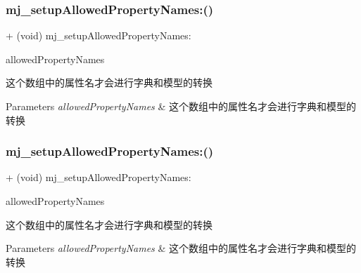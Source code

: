 \subsubsection{\texorpdfstring{mj\+\_\+setup\+Allowed\+Property\+Names\+:()}{mj\_setupAllowedPropertyNames:()}\hspace{0.1cm}{\footnotesize\ttfamily [1/3]}}
{\footnotesize\ttfamily + (void) mj\+\_\+setup\+Allowed\+Property\+Names\+: \begin{DoxyParamCaption}\item[{(M\+J\+Allowed\+Property\+Names)}]{allowed\+Property\+Names }\end{DoxyParamCaption}}

这个数组中的属性名才会进行字典和模型的转换


\begin{DoxyParams}{Parameters}
{\em allowed\+Property\+Names} & 这个数组中的属性名才会进行字典和模型的转换 \\
\hline
\end{DoxyParams}
\mbox{\label{category_n_s_object_07_m_j_class_08_a8a14f8d0e4307834475f58536240810f}} 
\subsubsection{\texorpdfstring{mj\+\_\+setup\+Allowed\+Property\+Names\+:()}{mj\_setupAllowedPropertyNames:()}\hspace{0.1cm}{\footnotesize\ttfamily [2/3]}}
{\footnotesize\ttfamily + (void) mj\+\_\+setup\+Allowed\+Property\+Names\+: \begin{DoxyParamCaption}\item[{(M\+J\+Allowed\+Property\+Names)}]{allowed\+Property\+Names }\end{DoxyParamCaption}}

这个数组中的属性名才会进行字典和模型的转换


\begin{DoxyParams}{Parameters}
{\em allowed\+Property\+Names} & 这个数组中的属性名才会进行字典和模型的转换 \\
\hline
\end{DoxyParams}
\mbox{\label{category_n_s_object_07_m_j_class_08_a8a14f8d0e4307834475f58536240810f}} 
